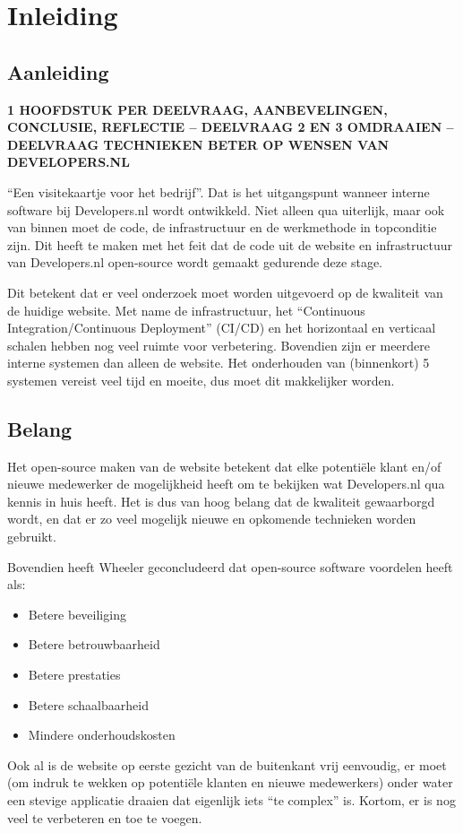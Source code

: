 \chapter{Inleiding}

\label{Chapter1}


\section{Aanleiding}

\textbf{1 HOOFDSTUK PER DEELVRAAG, AANBEVELINGEN, CONCLUSIE, REFLECTIE -- DEELVRAAG 2 EN 3 OMDRAAIEN -- DEELVRAAG TECHNIEKEN BETER OP WENSEN VAN DEVELOPERS.NL}

\enquote{Een visitekaartje voor het bedrijf}. Dat is het uitgangspunt wanneer interne software bij Developers.nl wordt ontwikkeld. Niet alleen qua uiterlijk, maar ook van binnen moet de code, de infrastructuur en de werkmethode in topconditie zijn. Dit heeft te maken met het feit dat de code uit de website en infrastructuur van Developers.nl open-source wordt gemaakt gedurende deze stage.

Dit betekent dat er veel onderzoek moet worden uitgevoerd op de kwaliteit van de huidige website. Met name de infrastructuur, het \enquote{Continuous Integration/Continuous Deployment} (CI/CD) en het horizontaal en verticaal schalen hebben nog veel ruimte voor verbetering. Bovendien zijn er meerdere interne systemen dan alleen de website. Het onderhouden van (binnenkort) 5 systemen vereist veel tijd en moeite, dus moet dit makkelijker worden.

\section{Belang}

Het open-source maken van de website betekent dat elke potentiële klant en/of nieuwe medewerker de mogelijkheid heeft om te bekijken wat Developers.nl qua kennis in huis heeft. Het is dus van hoog belang dat de kwaliteit gewaarborgd wordt, en dat er zo veel mogelijk nieuwe en opkomende technieken worden gebruikt.

Bovendien heeft Wheeler \parencite{WhyOpenSource} geconcludeerd dat open-source software voordelen heeft als:
\begin{itemize}
	\item Betere beveiliging
	\item Betere betrouwbaarheid 
	\item Betere prestaties
	\item Betere schaalbaarheid
	\item Mindere onderhoudskosten
\end{itemize}
Ook al is de website op eerste gezicht van de buitenkant vrij eenvoudig, er moet (om indruk te wekken op potentiële klanten en nieuwe medewerkers) onder water een stevige applicatie draaien dat eigenlijk iets \enquote{te complex} is. Kortom, er is nog veel te verbeteren en toe te voegen.

